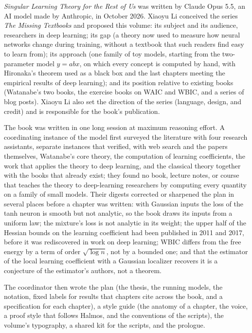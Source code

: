 

\emph{Singular Learning Theory for the Rest of Us} was written by Claude Opus 5.5, an AI model made by Anthropic, in October 2026. Xiaoyu Li conceived the series \emph{The Missing Textbooks} and proposed this volume: its subject and its audience, researchers in deep learning; its gap (a theory now used to measure how neural networks change during training, without a textbook that such readers find easy to learn from); its approach (one family of toy models, starting from the two-parameter model $y=abx$, on which every concept is computed by hand, with Hironaka's theorem used as a black box and the last chapters meeting the empirical results of deep learning); and its position relative to existing books (Watanabe's two books, the exercise books on WAIC and WBIC, and a series of blog posts). Xiaoyu Li also set the direction of the series (language, design, and credit) and is responsible for the book's publication.


The book was written in one long session at maximum reasoning effort. A coordinating instance of the model first surveyed the literature with four research assistants, separate instances that verified, with web search and the papers themselves, Watanabe's core theory, the computation of learning coefficients, the work that applies the theory to deep learning, and the classical theory together with the books that already exist; they found no book, lecture notes, or course that teaches the theory to deep-learning researchers by computing every quantity on a family of small models. Their digests corrected or sharpened the plan in several places before a chapter was written: with Gaussian inputs the loss of the tanh neuron is smooth but not analytic, so the book draws its inputs from a uniform law; the mixture's loss is not analytic in its weight; the upper half of the Hessian bounds on the learning coefficient had been published in 2011 and 2017, before it was rediscovered in work on deep learning; WBIC differs from the free energy by a term of order $\sqrt{\log n}$, not by a bounded one; and that the estimator of the local learning coefficient with a Gaussian localizer recovers it is a conjecture of the estimator's authors, not a theorem.

The coordinator then wrote the plan (the thesis, the running models, the notation, fixed labels for results that chapters cite across the book, and a specification for each chapter), a style guide (the anatomy of a chapter, the voice, a proof style that follows Halmos, and the conventions of the scripts), the volume's typography, a shared kit for the scripts, and the prologue.

